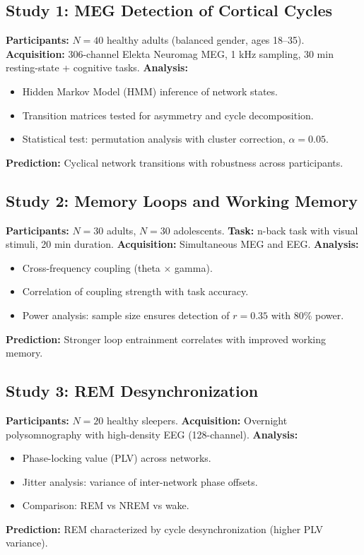 \documentclass{article}
\begin{document}
\subsection{Study 1: MEG Detection of Cortical Cycles}

\textbf{Participants:} $N=40$ healthy adults (balanced gender, ages 18--35).  
\textbf{Acquisition:} 306-channel Elekta Neuromag MEG, 1 kHz sampling, 30 min resting-state + cognitive tasks.  
\textbf{Analysis:}  
\begin{itemize}
    \item Hidden Markov Model (HMM) inference of network states.  
    \item Transition matrices tested for asymmetry and cycle decomposition.  
    \item Statistical test: permutation analysis with cluster correction, $\alpha = 0.05$.  
\end{itemize}  
\textbf{Prediction:} Cyclical network transitions with robustness across participants.  

\subsection{Study 2: Memory Loops and Working Memory}

\textbf{Participants:} $N=30$ adults, $N=30$ adolescents.  
\textbf{Task:} n-back task with visual stimuli, 20 min duration.  
\textbf{Acquisition:} Simultaneous MEG and EEG.  
\textbf{Analysis:}  
\begin{itemize}
    \item Cross-frequency coupling (theta $\times$ gamma).  
    \item Correlation of coupling strength with task accuracy.  
    \item Power analysis: sample size ensures detection of $r=0.35$ with 80\% power.  
\end{itemize}  
\textbf{Prediction:} Stronger loop entrainment correlates with improved working memory.  

\subsection{Study 3: REM Desynchronization}

\textbf{Participants:} $N=20$ healthy sleepers.  
\textbf{Acquisition:} Overnight polysomnography with high-density EEG (128-channel).  
\textbf{Analysis:}  
\begin{itemize}
    \item Phase-locking value (PLV) across networks.  
    \item Jitter analysis: variance of inter-network phase offsets.  
    \item Comparison: REM vs NREM vs wake.  
\end{itemize}  
\textbf{Prediction:} REM characterized by cycle desynchronization (higher PLV variance).  
\end{document}
